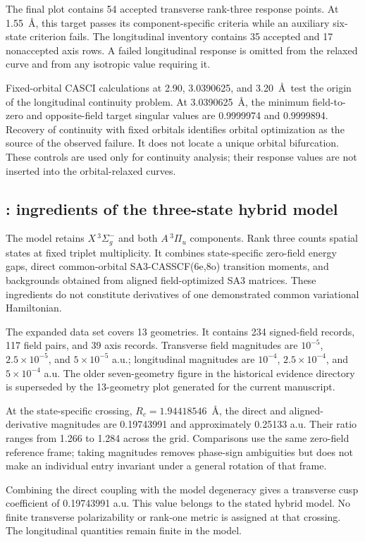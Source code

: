 \documentclass[aip,jcp,amsmath,amssymb,preprint,floatfix]{revtex4-1}
\begin{document}
The final plot contains 54 accepted transverse rank-three response points.
At 1.55~\AA, this target passes its component-specific criteria while an
auxiliary six-state criterion fails. The longitudinal inventory contains
35 accepted and 17 nonaccepted axis rows. A failed longitudinal response
is omitted from the relaxed curve and from any isotropic value requiring it.

Fixed-orbital CASCI calculations at 2.90, 3.0390625, and 3.20~\AA\ test
the origin of the longitudinal continuity problem. At 3.0390625~\AA,
the minimum field-to-zero and opposite-field target singular values are
0.9999974 and 0.9999894. Recovery of continuity with fixed orbitals identifies
orbital optimization as the source of the observed failure. It does not
locate a unique orbital bifurcation. These controls are used only for
continuity analysis; their response values are not inserted into the
orbital-relaxed curves.

\subsection{\texorpdfstring{}{B2}: ingredients of the three-state hybrid model}
The model retains $X\,{}^3\Sigma_g^-$ and both $A\,{}^3\Pi_u$ components.
Rank three counts spatial states at fixed triplet multiplicity. It combines
state-specific zero-field energy gaps, direct common-orbital
SA3-CASSCF(6e,8o) transition moments, and backgrounds obtained from
aligned field-optimized SA3 matrices. These ingredients do not constitute
derivatives of one demonstrated common variational Hamiltonian.

The expanded data set covers 13 geometries. It contains 234 signed-field
records, 117 field pairs, and 39 axis records. Transverse field
magnitudes are $10^{-5}$, $2.5\times10^{-5}$, and $5\times10^{-5}$ a.u.;
longitudinal magnitudes are $10^{-4}$, $2.5\times10^{-4}$, and
$5\times10^{-4}$ a.u. The older seven-geometry figure in the historical
evidence directory is superseded by the 13-geometry plot generated for
the current manuscript.

At the state-specific crossing, $R_c=1.94418546$~\AA, the direct and
aligned-derivative magnitudes are 0.19743991 and approximately 0.25133 a.u.
Their ratio ranges from 1.266 to 1.284 across the grid. Comparisons use
the same zero-field reference frame; taking magnitudes removes phase-sign
ambiguities but does not make an individual entry invariant under a
general rotation of that frame.

Combining the direct coupling with the model degeneracy gives a transverse
cusp coefficient of 0.19743991 a.u. This value belongs to the stated hybrid
model. No finite transverse polarizability or rank-one metric is assigned
at that crossing. The longitudinal quantities remain finite in the model.
\end{document}
